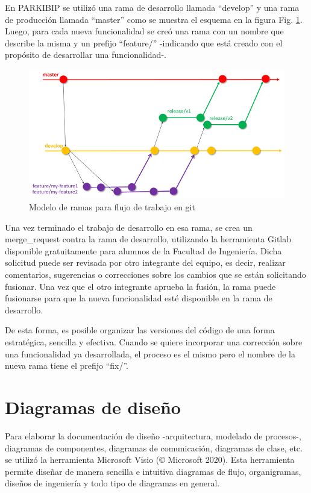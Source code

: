 En PARKIBIP se utilizó una rama de desarrollo llamada ``develop'' y una rama de producción llamada ``master'' como se muestra el esquema en la figura Fig. \ref{fig:branching-model}. Luego, para cada nueva funcionalidad se creó una rama con un nombre que describe la misma y un prefijo ``feature/'' -indicando que está creado con el propósito de desarrollar una funcionalidad-.

\begin{figure}[H]
\includegraphics[width=\textwidth]{TESIS/imagenes/chap04/gitflow-branching-model.png}
\caption{ Modelo de ramas para flujo de trabajo en git  }
\label{fig:branching-model}
\end{figure}

Una vez terminado el trabajo de desarrollo en esa rama, se crea un \gls{merge_request} contra la rama de desarrollo, utilizando la herramienta Gitlab disponible gratuitamente para alumnos de la Facultad de Ingeniería. Dicha solicitud puede ser revisada por otro integrante del equipo, es decir, realizar comentarios, sugerencias o correcciones sobre los cambios que se están solicitando fusionar. Una vez que el otro integrante aprueba la fusión, la rama puede fusionarse para que la nueva funcionalidad esté disponible en la rama de desarrollo. 

De esta forma, es posible organizar las versiones del código de una forma estratégica, sencilla y efectiva. Cuando se quiere incorporar una corrección sobre una funcionalidad ya desarrollada, el proceso es el mismo pero el nombre de la nueva rama tiene el prefijo ``fix/''.

\section{Diagramas de diseño}

Para elaborar la documentación de diseño -arquitectura, modelado de procesos-, diagramas de componentes, diagramas de comunicación, diagramas de clase, etc. se utilizó la herramienta Microsoft Visio (© Microsoft 2020). Esta herramienta permite diseñar de manera sencilla e intuitiva diagramas de flujo, organigramas, diseños de ingeniería y todo tipo de diagramas en general. 

